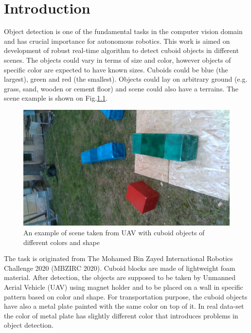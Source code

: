 \documentclass{ctuthesis}
\begin{document}
\maketitle

\chapter{Introduction}

Object detection is one of the fundamental tasks in the computer vision domain and has crucial importance for autonomous robotics. This work is aimed on development of robust real-time algorithm to detect cuboid objects in different scenes. The objects could vary in terms of size and color, however objects of specific color are expected to have known sizes. Cuboids could be blue (the largest), green and red (the smallest). Objects could lay on arbitrary ground (e.g. grass, sand, wooden or cement floor) and scene could also have a terrains. The scene example is shown on Fig.\ref{fig:1-1}.
\vspace{0.5cm}
\begin{figure}[htpb]
    \centering
    \includegraphics[width=\textwidth]{1.1}
    \caption{An example of scene taken from UAV with cuboid objects of different colors and shape}
    \label{fig:1-1}
\end{figure}

The task is originated from The Mohamed Bin Zayed International Robotics Challenge 2020 (MBZIRC 2020). Cuboid blocks are made of lightweight foam material. After detection, the objects are supposed to be taken by Unmanned Aerial Vehicle (UAV) using magnet holder and to be placed on a wall in specific pattern based on color and shape. For transportation purpose, the cuboid objects have also a metal plate painted with the same color on top of it. In real data-set the color of metal plate has slightly different color that introduces problems in object detection. 
\end{document}

